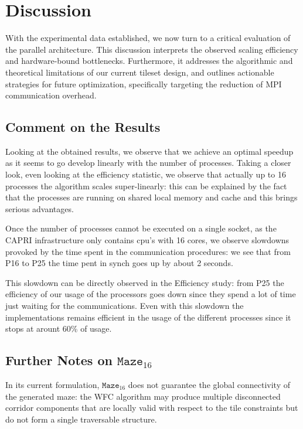 \section{Discussion}

With the experimental data established, we now turn to a critical evaluation of the parallel architecture. This discussion interprets the observed scaling efficiency and hardware-bound bottlenecks. Furthermore, it addresses the algorithmic and theoretical limitations of our current tileset design, and outlines actionable strategies for future optimization, specifically targeting the reduction of MPI communication overhead.

\subsection{Comment on the Results}
Looking at the obtained results, we observe that we achieve an optimal speedup as it seems to go develop linearly with the number of processes.
Taking a closer look, even looking at the efficiency statistic, we observe that actually up to 16 processes the algorithm scales super-linearly: this can be explained by the fact that the processes are running on shared local memory and cache and this brings serious advantages.

Once the number of processes cannot be executed on a single socket, as the CAPRI infrastructure only contains cpu's with 16 cores, we observe slowdowns provoked by the time spent in the communication procedures: we see that from P16 to P25 the time pent in synch goes up by about 2 seconds.

This slowdown can be directly observed in the Efficiency study: from P25 the efficiency of our usage of the processors goes down since they spend a lot of time just waiting for the communications. Even with this slowdown the implementations remains efficient in the usage of the different processes since it stops at arount 60\% of usage. 

\subsection{Further Notes on $\texttt{Maze}_{16}$}

In its current formulation, $\texttt{Maze}_{16}$ does not guarantee the global
connectivity of the generated maze: the WFC algorithm may produce multiple
disconnected corridor components that are locally valid with respect to the
tile constraints but do not form a single traversable structure.

